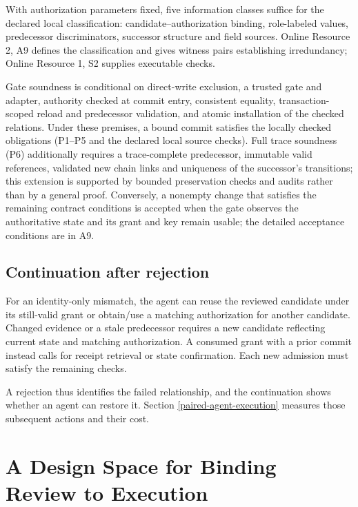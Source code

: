 With authorization parameters fixed, five information classes suffice for the declared local classification: candidate--authorization binding, role-labeled values, predecessor discriminators, successor structure and field sources. Online Resource 2, A9 defines the classification and gives witness pairs establishing irredundancy; Online Resource 1, S2 supplies executable checks.

Gate soundness is conditional on direct-write exclusion, a trusted gate and adapter, authority checked at commit entry, consistent equality, transaction-scoped reload and predecessor validation, and atomic installation of the checked relations. Under these premises, a bound commit satisfies the locally checked obligations (P1--P5 and the declared local source checks). Full trace soundness (P6) additionally requires a trace-complete predecessor, immutable valid references, validated new chain links and uniqueness of the successor's transitions; this extension is supported by bounded preservation checks and audits rather than by a general proof. Conversely, a nonempty change that satisfies the remaining contract conditions is accepted when the gate observes the authoritative state and its grant and key remain usable; the detailed acceptance conditions are in A9.

\subsection{Continuation after rejection}\label{continuation-after-rejection}

For an identity-only mismatch, the agent can reuse the reviewed candidate under its still-valid grant or obtain/use a matching authorization for another candidate. Changed evidence or a stale predecessor requires a new candidate reflecting current state and matching authorization. A consumed grant with a prior commit instead calls for receipt retrieval or state confirmation. Each new admission must satisfy the remaining checks.

A rejection thus identifies the failed relationship, and the continuation shows whether an agent can restore it. Section \ref{paired-agent-execution} measures those subsequent actions and their cost.

\section{A Design Space for Binding Review to Execution}\label{design-space}


